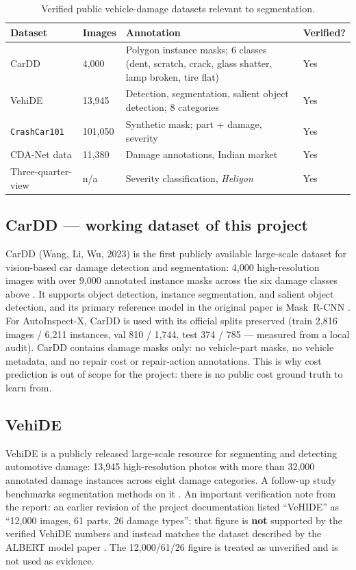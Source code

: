 \documentclass[conference]{IEEEtran}
\begin{document}
\begin{table}[!t]
\setlength{\tabcolsep}{4.5pt}
\renewcommand{\arraystretch}{1.15}
\caption{Verified public vehicle-damage datasets relevant to segmentation.}
\label{tab:data}
\centering
\begin{tabular}{@{}p{1.9cm}p{1.1cm}p{1.6cm}p{2.6cm}@{}}
\toprule
\textbf{Dataset} & \textbf{Images} & \textbf{Annotation} & \textbf{Verified?}\\
\midrule
CarDD \cite{cardd2023} & 4,000 & Polygon instance masks; 6 classes (dent, scratch, crack, glass shatter, lamp broken, tire flat) & Yes\\
VehiDE \cite{vehide2023} & 13,945 & Detection, segmentation, salient object detection; 8 categories & Yes\\
\texttt{CrashCar101} \cite{crashcar101} & 101,050 & Synthetic mask; part + damage, severity & Yes\\
CDA-Net data \cite{cdanet2023} & 11,380 & Damage annotations, Indian market & Yes\\
Three-quarter-view \cite{threequarter2024} & n/a & Severity classification, \emph{Heliyon} & Yes\\
\bottomrule
\end{tabular}
\end{table}

\subsection{CarDD --- working dataset of this project}
CarDD (Wang, Li, Wu, 2023) is the first publicly available large-scale dataset
for vision-based car damage detection and segmentation: 4,000 high-resolution
images with over 9,000 annotated instance masks across the six damage classes
above \cite{cardd2023}. It supports object detection, instance segmentation, and
salient object detection, and its primary reference model in the original paper
is Mask~R-CNN \cite{cardd2023,maskrcnn2017}. For AutoInspect-X, CarDD is used
with its official splits preserved (train 2,816 images / 6,211 instances, val
810 / 1,744, test 374 / 785 --- measured from a local audit). CarDD contains
damage masks only: no vehicle-part masks, no vehicle metadata, and no repair
cost or repair-action annotations. This is why cost prediction is out of scope
for the project: there is no public cost ground truth to learn from.

\subsection{VehiDE}
VehiDE \cite{vehide2023} is a publicly released large-scale resource for
segmenting and detecting automotive damage: 13,945 high-resolution photos with
more than 32,000 annotated damage instances across eight damage categories. A
follow-up study benchmarks segmentation methods on it
\cite{vehide2025}. An important verification note from the report: an earlier
revision of the project documentation listed ``VeHIDE'' as ``12,000 images, 61
parts, 26 damage types''; that figure is \textbf{not} supported by the verified
VehiDE numbers and instead matches the dataset described by the ALBERT model
paper \cite{albert2025}. The 12,000/61/26 figure is treated as unverified and is
not used as evidence.
\end{document}
